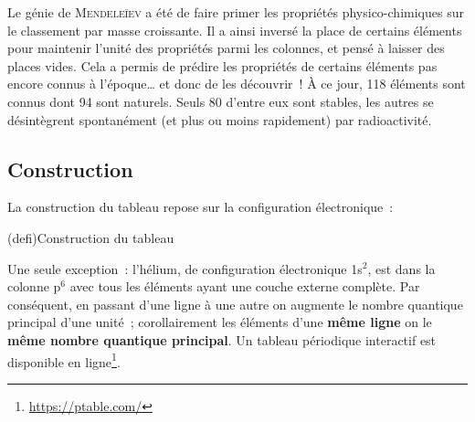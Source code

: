 \documentclass[../../main/main.tex]{subfiles}
\begin{document}
Le génie de \textsc{Mendeleïev} a été de faire primer les propriétés
physico-chimiques sur le classement par masse croissante. Il a ainsi inversé la
place de certains éléments pour maintenir l'unité des propriétés parmi les
colonnes, et pensé à laisser des places vides. Cela a permis de prédire les
propriétés de certains éléments pas encore connus à l'époque… et donc de les
découvrir~! À ce jour, 118 éléments sont connus dont 94 sont naturels. Seuls 80
d'entre eux sont stables, les autres se désintègrent spontanément (et plus ou
moins rapidement) par radioactivité.

\subsection{Construction}
La construction du tableau repose sur la configuration électronique~:

\begin{tcb*}[cnt](defi){Construction du tableau}
\end{tcb*}
Une seule exception~: l'hélium, de configuration électronique 1s$^2$, est dans
la colonne p$^6$ avec tous les éléments ayant une couche externe complète.
\bigbreak
Par conséquent, en passant d'une ligne à une autre on augmente le nombre
quantique principal d'une unité~; corollairement les éléments d'une \textbf{même
	ligne} on le \textbf{même nombre quantique principal}. Un tableau périodique
interactif est disponible en ligne\footnote{\url{https://ptable.com/}}.

\end{document}
